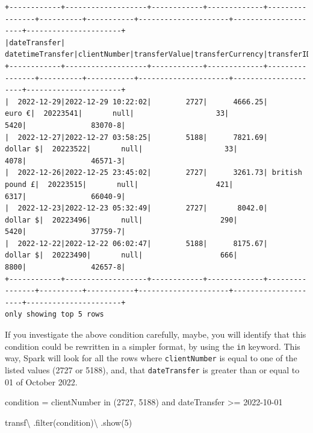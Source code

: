 \documentclass[
  11pt,
  letterpaper,
  DIV=11,
  numbers=noendperiod]{scrreprt}
\newenvironment{Shaded}{\begin{snugshade}}{\end{snugshade}}
\newcommand{\BuiltInTok}[1]{\textcolor[rgb]{0.00,0.23,0.31}{#1}}
\newcommand{\DecValTok}[1]{\textcolor[rgb]{0.68,0.00,0.00}{#1}}
\newcommand{\NormalTok}[1]{\textcolor[rgb]{0.00,0.23,0.31}{#1}}
\newcommand{\OperatorTok}[1]{\textcolor[rgb]{0.37,0.37,0.37}{#1}}
\newcommand{\StringTok}[1]{\textcolor[rgb]{0.13,0.47,0.30}{#1}}
\begin{document}
\begin{verbatim}
+------------+-------------------+------------+-------------+----------------+----------+-----------+---------------------+---------------------+----------------------+
|dateTransfer|   datetimeTransfer|clientNumber|transferValue|transferCurrency|transferID|transferLog|destinationBankNumber|destinationBankBranch|destinationBankAccount|
+------------+-------------------+------------+-------------+----------------+----------+-----------+---------------------+---------------------+----------------------+
|  2022-12-29|2022-12-29 10:22:02|        2727|      4666.25|          euro €|  20223541|       null|                   33|                 5420|               83070-8|
|  2022-12-27|2022-12-27 03:58:25|        5188|      7821.69|        dollar $|  20223522|       null|                   33|                 4078|               46571-3|
|  2022-12-26|2022-12-25 23:45:02|        2727|      3261.73| british pound £|  20223515|       null|                  421|                 6317|               66040-9|
|  2022-12-23|2022-12-23 05:32:49|        2727|       8042.0|        dollar $|  20223496|       null|                  290|                 5420|               37759-7|
|  2022-12-22|2022-12-22 06:02:47|        5188|      8175.67|        dollar $|  20223490|       null|                  666|                 8800|               42657-8|
+------------+-------------------+------------+-------------+----------------+----------+-----------+---------------------+---------------------+----------------------+
only showing top 5 rows
\end{verbatim}

If you investigate the above condition carefully, maybe, you will
identify that this condition could be rewritten in a simpler format, by
using the \texttt{in} keyword. This way, Spark will look for all the
rows where \texttt{clientNumber} is equal to one of the listed values
(2727 or 5188), and, that \texttt{dateTransfer} is greater than or equal
to 01 of October 2022.

\begin{Shaded}
\begin{Highlighting}[]
\NormalTok{condition }\OperatorTok{=} \StringTok{\textquotesingle{}\textquotesingle{}\textquotesingle{}}
\StringTok{  clientNumber in (2727, 5188)}
\StringTok{  and dateTransfer \textgreater{}= \textquotesingle{}2022{-}10{-}01\textquotesingle{}}
\StringTok{\textquotesingle{}\textquotesingle{}\textquotesingle{}}

\NormalTok{transf}\OperatorTok{\textbackslash{}}
\NormalTok{  .}\BuiltInTok{filter}\NormalTok{(condition)}\OperatorTok{\textbackslash{}}
\NormalTok{  .show(}\DecValTok{5}\NormalTok{)}
\end{Highlighting}
\end{Shaded}
\end{document}
